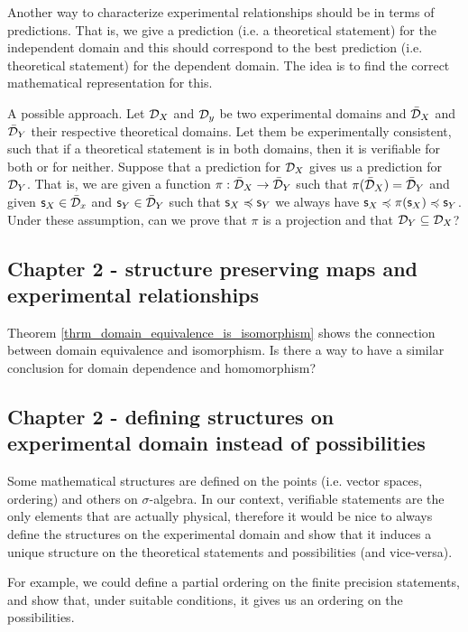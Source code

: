 \documentclass[11pt,letterpaper,fleqn]{memoir} %
\begin{document}
Another way to characterize experimental relationships should be in terms of predictions. That is, we give a prediction (i.e. a theoretical statement) for the independent domain and this should correspond to the best prediction (i.e. theoretical statement) for the dependent domain. The idea is to find the correct mathematical representation for this.

A possible approach. Let $\mathcal{D}_X$ and $\mathcal{D}_y$ be two experimental domains and $\bar{\mathcal{D}}_X$ and $\bar{\mathcal{D}}_Y$ their respective theoretical domains. Let them be experimentally consistent, such that if a theoretical statement is in both domains, then it is verifiable for both or for neither. Suppose that a prediction for $\mathcal{D}_X$ gives us a prediction for $\mathcal{D}_Y$. That is, we are given a function $\pi: \bar{\mathcal{D}}_X \to \bar{\mathcal{D}}_Y$ such that $\pi(\bar{\mathcal{D}}_X) = \bar{\mathcal{D}}_Y$ and given $\mathsf{s}_X \in \bar{\mathcal{D}}_x$ and $\mathsf{s}_Y \in \bar{\mathcal{D}}_Y$ such that $\mathsf{s}_X \preccurlyeq \mathsf{s}_Y$ we always have $\mathsf{s}_X \preccurlyeq \pi(\mathsf{s}_X) \preccurlyeq \mathsf{s}_Y$. Under these assumption, can we prove that $\pi$ is a projection and that $\mathcal{D}_Y \subseteq \mathcal{D}_X$?

\subsection{Chapter 2 - structure preserving maps and experimental relationships}

Theorem \ref{thrm_domain_equivalence_is_isomorphism} shows the connection between domain equivalence and isomorphism. Is there a way to have a similar conclusion for domain dependence and homomorphism?

\subsection{Chapter 2 - defining structures on experimental domain instead of possibilities}

Some mathematical structures are defined on the points (i.e. vector spaces, ordering) and others on $\sigma$-algebra. In our context, verifiable statements are the only elements that are actually physical, therefore it would be nice to always define the structures on the experimental domain and show that it induces a unique structure on the theoretical statements and possibilities (and vice-versa).

For example, we could define a partial ordering on the finite precision statements, and show that, under suitable conditions, it gives us an ordering on the possibilities.
\end{document}

